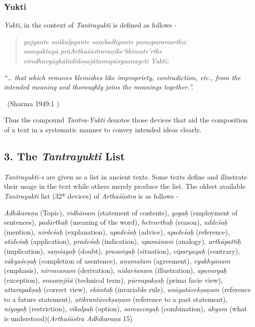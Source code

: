 \subsubsection*{Yukti}

\textit{Yukti}, in the context of \textit{Tantrayukti} is defined as follows -

\begin{verse}
\textit{yujyante saṅkalpyante saṃbadhyante parasparamarthā:}\\\textit{samyaktayā prāArthaśāstraraṇike‘bhimate’rthe}\\\textit{virodhavyāghātādidoṣajātamapāsyaanayeti Yukti:}
\end{verse}

\begin{myquote}
\textit{“… that which removes blemishes like impropriety, contradiction, etc., from the intended meaning and thoroughly joins the meanings together.”.}

~\hfill (Sharma 1949:1 )
\end{myquote}

Thus the compound \textit{Tantra-Yukti} denotes those devices that aid the composition of a text in a systematic manner to convey intended ideas clearly.


\subsection*{3. The \textit{Tantrayukti} List }

\textit{Tantrayukti-s} are given as a list in ancient texts. Some texts define and illustrate their usage in the text while others merely produce the list. The oldest available \textit{Tantrayukti} list (32* devices) of \textit{Arthaśāstra} is as follows -

\textit{Adhikaraṇa} (Topic), \textit{vidhānam} (statement of contents), \textit{yogaḥ} (employment of sentences), \textit{padārthaḥ} (meaning of the word), \textit{hetvarthaḥ} (reason), \textit{uddeśaḥ} (mention), \textit{nirdeśaḥ} (explanation), \textit{upadeśaḥ} (advice), \textit{apa\-deśaḥ} (reference), \textit{atideśaḥ} (application), \textit{pradeśaḥ} (indication), \textit{upamānam} (analogy), \textit{arthāpattiḥ} (implication), \textit{saṃśayaḥ} (doubt), \textit{prasaṅgaḥ} (situation), \textit{viparyayaḥ} (contrary), \textit{vākyaśeṣaḥ} (completion of a\break sentence), \textit{anumatam} (agreement), \textit{vyakhyānam} (emphasis), \textit{nirvacanam} (derivation), \textit{nidarśanam} (illustration), \textit{apavargaḥ} (exception), \textit{svasaṃjñā} (technical term), \textit{pūrvapakṣaḥ} (prima facie view), \textit{uttarapakṣaḥ} (correct view), \textit{ekāntaḥ} (invariable rule), \textit{anāgatāvekṣaṇam} (reference to a future statement), \textit{atikrantāvekṣaṇam} (reference to a past statement), \textit{niyogaḥ} (restriction), \textit{vikalpaḥ} (option), \textit{samuccayaḥ} (combination), \textit{ūhyam} (what is understood)\hfill (\textit{Arthaśāstra Adhikaraṇa} 15)

